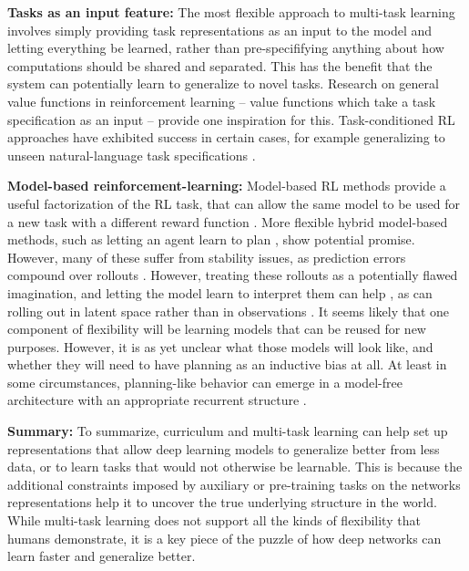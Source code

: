 \textbf{Tasks as an input feature:} The most flexible approach to multi-task learning involves simply providing task representations as an input to the model and letting everything be learned, rather than pre-specififying anything about how computations should be shared and separated. This has the benefit that the system can potentially learn to generalize to novel tasks. Research on general value functions in reinforcement learning \citep{Sutton2011} -- value functions which take a task specification as an input -- provide one inspiration for this. Task-conditioned RL approaches have exhibited success in certain cases, for example generalizing to unseen natural-language task specifications \citep{Hermann2017}.  \par

\textbf{Model-based reinforcement-learning:} Model-based RL methods provide a useful factorization of the RL task, that can allow the same model to be used for a new task with a different reward function \citep[e.g.][]{Laroche2017}. More flexible hybrid model-based methods, such as letting an agent learn to plan \citep{Tamar2017}, show potential promise. However, many of these suffer from stability issues, as prediction errors compound over rollouts \citep{Talvitie2014}. However, treating these rollouts as a potentially flawed imagination, and letting the model learn to interpret them can help \citep{Racaniere2017}, as can rolling out in latent space rather than in observations \citep{Gregor2019}. It seems likely that one component of flexibility will be learning models that can be reused for new purposes. However, it is as yet unclear what those models will look like, and whether they will need to have planning as an inductive bias at all. At least in some circumstances, planning-like behavior can emerge in a model-free architecture with an appropriate recurrent structure \cite{Guez2019}. \par

\textbf{Summary:} To summarize, curriculum and multi-task learning can help set up representations that allow deep learning models to generalize better from less data, or to learn tasks that would not otherwise be learnable. This is because the additional constraints imposed by auxiliary or pre-training tasks on the networks representations help it to uncover the true underlying structure in the world. While multi-task learning does not support all the kinds of flexibility that humans demonstrate, it is a key piece of the puzzle of how deep networks can learn faster and generalize better. \par

